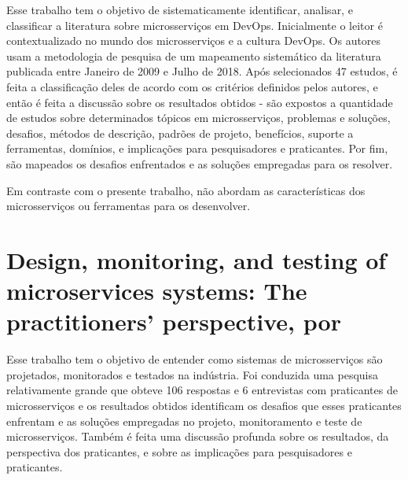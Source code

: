 Esse trabalho tem o objetivo de sistematicamente identificar, analisar, e classificar a literatura sobre microsserviços em DevOps. Inicialmente o leitor é contextualizado no mundo dos microsserviços e a cultura DevOps. Os autores usam a metodologia de pesquisa de um mapeamento sistemático da literatura publicada entre Janeiro de 2009 e Julho de 2018. Após selecionados 47 estudos, é feita a classificação deles de acordo com os critérios definidos pelos autores, e então é feita a discussão sobre os resultados obtidos - são expostos a quantidade de estudos sobre determinados tópicos em microsserviços, problemas e soluções, desafios, métodos de descrição, padrões de projeto, benefícios, suporte a ferramentas, domínios, e implicações para pesquisadores e praticantes. Por fim, são mapeados os desafios enfrentados e as soluções empregadas para os resolver.

Em contraste com o presente trabalho,  não abordam as características dos microsserviços ou ferramentas para os desenvolver.


\section{Design, monitoring, and testing of microservices systems: The practitioners’ perspective, por \texorpdfstring{}{Waseem et al. (2021)}}

Esse trabalho tem o objetivo de entender como sistemas de microsserviços são projetados, monitorados e testados na indústria. Foi conduzida uma pesquisa relativamente grande que obteve 106 respostas e 6 entrevistas com praticantes de microsserviços e os resultados obtidos identificam os desafios que esses praticantes enfrentam e as soluções empregadas no projeto, monitoramento e teste de microsserviços. Também é feita uma discussão profunda sobre os resultados, da perspectiva dos praticantes, e sobre as implicações para pesquisadores e praticantes.

